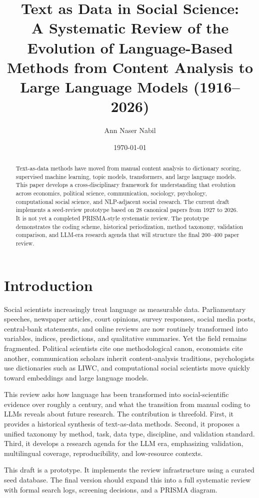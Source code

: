 \documentclass[11pt]{article}
\title{Text as Data in Social Science:\\ A Systematic Review of the Evolution of Language-Based Methods from Content Analysis to Large Language Models (1916--2026)}
\author{Ann Naser Nabil}
\date{\today}
\begin{document}
\maketitle

\begin{abstract}
Text-as-data methods have moved from manual content analysis to dictionary scoring, supervised machine learning, topic models, transformers, and large language models. This paper develops a cross-disciplinary framework for understanding that evolution across economics, political science, communication, sociology, psychology, computational social science, and NLP-adjacent social research. The current draft implements a seed-review prototype based on 28 canonical papers from 1927 to 2026. It is not yet a completed PRISMA-style systematic review. The prototype demonstrates the coding scheme, historical periodization, method taxonomy, validation comparison, and LLM-era research agenda that will structure the final 200--400 paper review.
\end{abstract}

\section{Introduction}

Social scientists increasingly treat language as measurable data. Parliamentary speeches, newspaper articles, court opinions, survey responses, social media posts, central-bank statements, and online reviews are now routinely transformed into variables, indices, predictions, and qualitative summaries. Yet the field remains fragmented. Political scientists cite one methodological canon, economists cite another, communication scholars inherit content-analysis traditions, psychologists use dictionaries such as LIWC, and computational social scientists move quickly toward embeddings and large language models.

This review asks how language has been transformed into social-scientific evidence over roughly a century, and what the transition from manual coding to LLMs reveals about future research. The contribution is threefold. First, it provides a historical synthesis of text-as-data methods. Second, it proposes a unified taxonomy by method, task, data type, discipline, and validation standard. Third, it develops a research agenda for the LLM era, emphasizing validation, multilingual coverage, reproducibility, and low-resource contexts.

This draft is a prototype. It implements the review infrastructure using a curated seed database. The final version should expand this into a full systematic review with formal search logs, screening decisions, and a PRISMA diagram.
\end{document}
